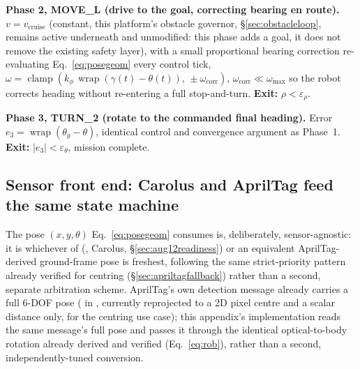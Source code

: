 \textbf{Phase 2, MOVE\_L (drive to the goal, correcting bearing en route).}
$v = v_{\text{cruise}}$ (constant, this platform's obstacle governor,
\S\ref{sec:obstacleloop}, remains active underneath and unmodified: this
phase adds a goal, it does not remove the existing safety layer), with a
small proportional bearing correction re-evaluating
Eq.~\ref{eq:posegeom} every control tick,
$\omega = \operatorname{clamp}(k_\phi\,\operatorname{wrap}(\gamma(t)-\theta(t)),\,\pm\omega_{\text{corr}})$,
$\omega_{\text{corr}}\ll\omega_{\max}$ so the robot corrects heading without
re-entering a full stop-and-turn. \textbf{Exit:} $\rho<\varepsilon_\rho$.

\textbf{Phase 3, TURN\_2 (rotate to the commanded final heading).} Error
$e_3 = \operatorname{wrap}(\theta_g-\theta)$, identical control and
convergence argument as Phase~1. \textbf{Exit:} $|e_3|<\varepsilon_\theta$,
mission complete.

\subsection{Sensor front end: Carolus and AprilTag feed the same state
machine}
\label{ap:posecontrolsensor}
The pose $(x,y,\theta)$ Eq.~\ref{eq:posegeom} consumes is, deliberately,
sensor-agnostic: it is whichever of 
(, Carolus, \S\ref{sec:aug12readiness}) or an
equivalent AprilTag-derived ground-frame pose is freshest, following the
same strict-priority pattern already verified for centring
(\S\ref{sec:apriltagfallback}) rather than a second, separate arbitration
scheme. AprilTag's own detection message already carries a full 6-DOF pose
( in , currently
reprojected to a 2D pixel centre and a scalar distance only, for the
centring use case); this appendix's implementation reads the same message's
full pose and passes it through the identical optical-to-body rotation
already derived and verified (Eq.~\ref{eq:rob}), rather than a second,
independently-tuned conversion.

